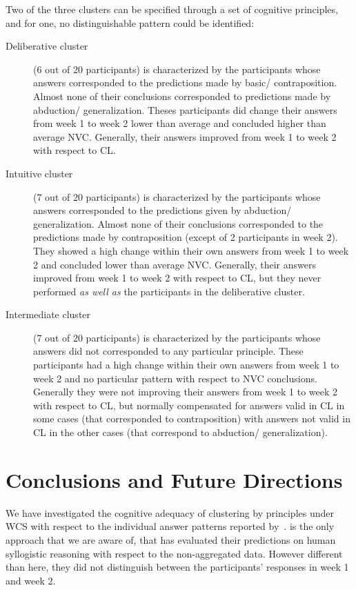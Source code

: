 \documentclass[12pt]{article}
\begin{document}
Two of the three clusters can be specified through a set of cognitive principles, and for one, no distinguishable pattern could be identified:
\begin{description}
 \item[Deliberative cluster] (6 out of 20 participants) is characterized by the participants whose answers corresponded to the predictions made by basic/ contraposition. Almost none of their conclusions corresponded to predictions made by abduction/ generalization. Theses participants did change their answers from week 1 to week 2 
 lower than average and concluded higher than average NVC. Generally, their answers improved from week 1 to week 2 with respect to CL.
 \item[Intuitive cluster] (7 out of 20 participants)
is characterized by the participants whose answers corresponded to the predictions given by abduction/ generalization. Almost none of their conclusions corresponded to the predictions made by contraposition (except of 2 participants in week 2). They showed a high change within their own answers from week 1 to week 2 
 and concluded lower than average NVC. Generally, their answers improved from week 1 to week 2 with respect to CL, but they never performed \textit{as well as} the participants in 
 the deliberative cluster.
 \item[Intermediate cluster] (7 out of 20 participants) is characterized by the participants whose answers did not corresponded to any particular principle. These participants had a high change within their own answers from week 1 to week 2
 and no particular pattern with respect to NVC conclusions. Generally they were not improving their answers from week 1 to week 2 with respect to CL, but normally compensated for answers valid in CL in some cases (that corresponded to contraposition) with answers not valid in CL in the other cases (that correspond to abduction/ generalization).
\end{description}

 \section{Conclusions and Future Directions}
 
 
We have investigated the cognitive adequacy of clustering by principles under WCS with respect to the individual answer patterns reported by~\cite{khemlani:2016}.
\cite{khemlani:2016} is the only approach that we are aware of, that has evaluated their predictions on human syllogistic reasoning
with respect to the non-aggregated data.
However different than here, they did not distinguish between the participants' responses in week 1 and week 2.
 
\end{document}
